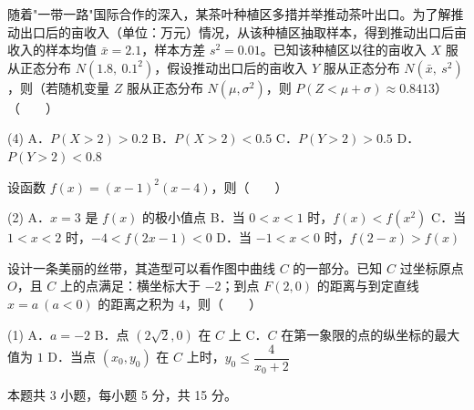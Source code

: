 \begin{question}
随着"一带一路"国际合作的深入，某茶叶种植区多措并举推动茶叶出口。为了解推动出口后的亩收入（单位：万元）情况，从该种植区抽取样本，得到推动出口后亩收入的样本均值 $\bar x=2.1$，样本方差 $s^{2}=0.01$。已知该种植区以往的亩收入 $X$ 服从正态分布 $N\left(1.8,\ 0.1^{2}\right)$，假设推动出口后的亩收入 $Y$ 服从正态分布 $N\left(\bar x,\ s^{2}\right)$，则（若随机变量 $Z$ 服从正态分布 $N\left(\mu,\sigma^{2}\right)$，则 $P(Z<\mu+\sigma)\approx0.8413$）（　　）

\begin{gkopts}(4)
\task A．$P(X>2)>0.2$
\task B．$P(X>2)<0.5$
\task C．$P(Y>2)>0.5$
\task D．$P(Y>2)<0.8$
\end{gkopts}

\end{question}
\begin{question}
设函数 $f(x)=(x-1)^{2}(x-4)$，则（　　）

\begin{gkopts}(2)
\task A．$x=3$ 是 $f(x)$ 的极小值点
\task B．当 $0<x<1$ 时，$f(x)<f\left(x^{2}\right)$
\task C．当 $1<x<2$ 时，$-4<f(2x-1)<0$
\task D．当 $-1<x<0$ 时，$f(2-x)>f(x)$
\end{gkopts}

\Needspace{0.4\textheight}
\end{question}
\begin{question}
设计一条美丽的丝带，其造型可以看作图中曲线 $C$ 的一部分。已知 $C$ 过坐标原点 $O$，且 $C$ 上的点满足：横坐标大于 $-2$；到点 $F(2,0)$ 的距离与到定直线 $x=a\ (a<0)$ 的距离之积为 $4$，则（　　）
\nopagebreak[4]
\begin{center}\end{center}
\nopagebreak[4]
\begin{gkopts}(1)
\task A．$a=-2$
\task B．点 $\left(2\sqrt2,0\right)$ 在 $C$ 上
\task C．$C$ 在第一象限的点的纵坐标的最大值为 $1$
\task D．当点 $\left(x_0,y_0\right)$ 在 $C$ 上时，$y_0\le\dfrac{4}{x_0+2}$
\end{gkopts}

\par\medskip

\end{question}

\begin{gktip}
本题共 3 小题，每小题 5 分，共 15 分。
\end{gktip}

